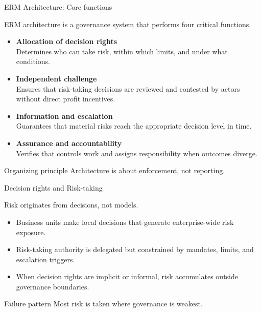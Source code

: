 \documentclass[aspectratio=169, 10pt]{beamer} %
\begin{document}
\begin{frame}{ERM Architecture: Core functions}

ERM architecture is a governance system that performs four critical functions.

\medskip

\begin{itemize}
  \item[$\bullet$] \textbf{Allocation of decision rights}\\
  Determines who can take risk, within which limits, and under what conditions.

  \item[$\bullet$] \textbf{Independent challenge}\\
  Ensures that risk-taking decisions are reviewed and contested by actors
  without direct profit incentives.

  \item[$\bullet$] \textbf{Information and escalation}\\
  Guarantees that material risks reach the appropriate decision level in time.

  \item[$\bullet$] \textbf{Assurance and accountability}\\
  Verifies that controls work and assigns responsibility when outcomes diverge.
\end{itemize}

\begin{block}{Organizing principle}
Architecture is about enforcement, not reporting.
\end{block}

\end{frame}

\begin{frame}{Decision rights and Risk-taking}

Risk originates from decisions, not models.

\medskip

\begin{itemize}
  \item[$\bullet$] Business units make local decisions that generate enterprise-wide
  risk exposure.

  \item[$\bullet$] Risk-taking authority is delegated but constrained by mandates,
  limits, and escalation triggers.

  \item[$\bullet$] When decision rights are implicit or informal, risk accumulates
  outside governance boundaries.
\end{itemize}

\begin{block}{Failure pattern}
Most risk is taken where governance is weakest.
\end{block}

\end{frame}
\end{document}

